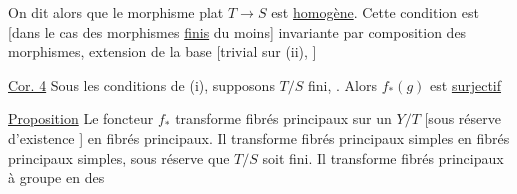 On dit alors que le morphisme  plat $T\to S$ est \uline{homogène}.  Cette condition est [dans le cas des morphismes \uline{finis} du moins] invariante par composition des morphismes, extension de la base [trivial sur (ii), ]


\uline{Cor. 4} Sous les conditions de (i), supposons $T/S$ fini,  . Alors $f_*(g)$ est \uline{surjectif}

\uline{Proposition} Le foncteur $f_*$ transforme fibrés  principaux sur un $Y/T$ [sous réserve d'existence ] en fibrés  principaux.
Il transforme fibrés principaux simples en fibrés principaux simples, sous réserve que $T/S$ soit fini.
Il transforme  fibrés principaux à groupe      en  des

